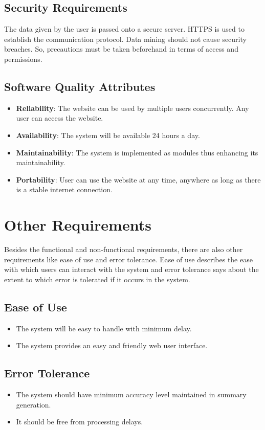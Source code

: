 \documentclass[11pt]{report}
\begin{document}
\subsection{Security Requirements}
The data given by the user is passed onto a secure server. HTTPS is used to establish the communication protocol. Data mining should not cause security breaches. So, precautions must be taken beforehand in terms of access and permissions. 

\subsection{Software Quality Attributes}
\begin{itemize}

\item \textbf{Reliability}: The website can be used by multiple users concurrently. Any user can access the website.
\item \textbf{Availability}: The system will be available 24 hours a day.
\item \textbf{Maintainability}: The system is implemented as modules thus enhancing its maintainability.
\item \textbf{Portability}: User can use the website at any time, anywhere as long as there is a stable internet connection.
\end{itemize}

\section{Other Requirements} 
Besides the functional and non-functional requirements, there are also other requirements like ease of use and error tolerance. Ease of use describes the ease with which users can interact with the system and error tolerance says about the extent to which error is tolerated if it occurs in the system.

\subsection{Ease of Use}
\begin{itemize}
\item The system will be easy to handle with minimum delay.
\item The system provides an easy and friendly web user interface.
\end{itemize}

\subsection{Error Tolerance}
\begin{itemize}
\item The system should have minimum accuracy level maintained in summary generation.
\item It should be free from processing delays.
\end{itemize}
\end{document}
